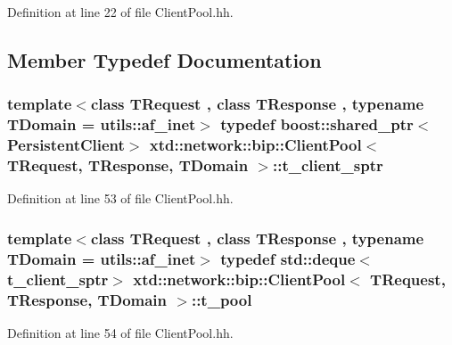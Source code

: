 Definition at line 22 of file Client\-Pool.\-hh.



\subsection{Member Typedef Documentation}
\hypertarget{classxtd_1_1network_1_1bip_1_1ClientPool_ac3b215a76aeb124011801824f993a52b}{
\subsubsection[{t\-\_\-client\-\_\-sptr}]{\setlength{\rightskip}{0pt plus 5cm}template$<$class T\-Request , class T\-Response , typename T\-Domain  = utils\-::af\-\_\-inet$>$ typedef boost\-::shared\-\_\-ptr$<${\bf Persistent\-Client}$>$ {\bf xtd\-::network\-::bip\-::\-Client\-Pool}$<$ T\-Request, T\-Response, T\-Domain $>$\-::{\bf t\-\_\-client\-\_\-sptr}}}\label{classxtd_1_1network_1_1bip_1_1ClientPool_ac3b215a76aeb124011801824f993a52b}


Definition at line 53 of file Client\-Pool.\-hh.

\hypertarget{classxtd_1_1network_1_1bip_1_1ClientPool_ab0b045804570a41e6e491a715d56a469}{
\subsubsection[{t\-\_\-pool}]{\setlength{\rightskip}{0pt plus 5cm}template$<$class T\-Request , class T\-Response , typename T\-Domain  = utils\-::af\-\_\-inet$>$ typedef std\-::deque$<${\bf t\-\_\-client\-\_\-sptr}$>$ {\bf xtd\-::network\-::bip\-::\-Client\-Pool}$<$ T\-Request, T\-Response, T\-Domain $>$\-::{\bf t\-\_\-pool}}}\label{classxtd_1_1network_1_1bip_1_1ClientPool_ab0b045804570a41e6e491a715d56a469}


Definition at line 54 of file Client\-Pool.\-hh.



